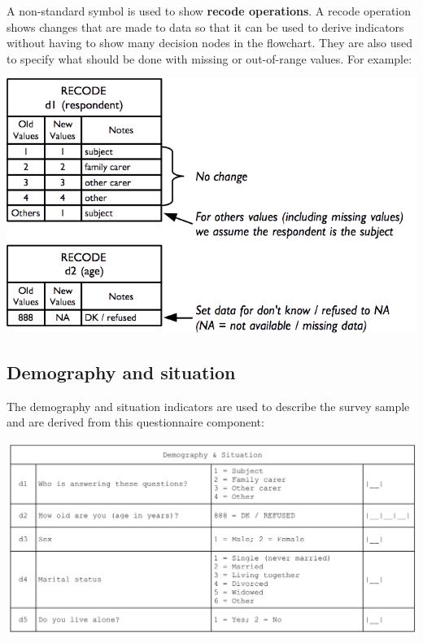 \documentclass[12pt,a4paper]{book}
\theoremstyle{definition}
\theoremstyle{definition}
\theoremstyle{definition}
\theoremstyle{remark}
\begin{document}
A non-standard symbol is used to show \textbf{recode operations}. A
recode operation shows changes that are made to data so that it can be
used to derive indicators without having to show many decision nodes in
the flowchart. They are also used to specify what should be done with
missing or out-of-range values. For example:

\begin{center}\includegraphics[width=9.76in]{figures/indicators02} \end{center}

\hypertarget{demography-and-situation}{%
\subsection{Demography and situation}\label{demography-and-situation}}

The demography and situation indicators are used to describe the survey
sample and are derived from this questionnaire component:

\begin{center}\includegraphics[width=23.96in]{figures/questionnaire01} \end{center}
\end{document}

